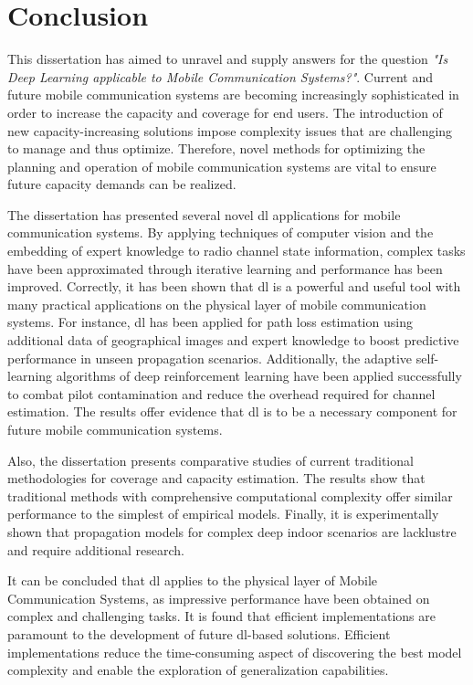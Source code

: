 \chapter{Conclusion}\label{ch:conclusion}

This dissertation has aimed to unravel and supply answers for the question \emph{"Is Deep Learning applicable to Mobile Communication Systems?"}. Current and future mobile communication systems are becoming increasingly sophisticated in order to increase the capacity and coverage for end users. The introduction of new capacity-increasing solutions impose complexity issues that are challenging to manage and thus optimize. Therefore, novel methods for optimizing the planning and operation of mobile communication systems are vital to ensure future capacity demands can be realized.

The dissertation has presented several novel \acrlong{dl} applications for mobile communication systems. By applying techniques of computer vision and the embedding of expert knowledge to radio channel state information, complex tasks have been approximated through iterative learning and performance has been improved. Correctly, it has been shown that \acrlong{dl} is a powerful and useful tool with many practical applications on the physical layer of mobile communication systems. For instance, \acrlong{dl} has been applied for path loss estimation using additional data of geographical images and expert knowledge to boost predictive performance in unseen propagation scenarios. Additionally, the adaptive self-learning algorithms of deep reinforcement learning have been applied successfully to combat pilot contamination and reduce the overhead required for channel estimation. The results offer evidence that \acrlong{dl} is to be a necessary component for future mobile communication systems.

Also, the dissertation presents comparative studies of current traditional methodologies for coverage and capacity estimation. The results show that traditional methods with comprehensive computational complexity offer similar performance to the simplest of empirical models. Finally, it is experimentally shown that propagation models for complex deep indoor scenarios are lacklustre and require additional research.

It can be concluded that \acrlong{dl} applies to the physical layer of Mobile Communication Systems, as impressive performance have been obtained on complex and challenging tasks. It is found that efficient implementations are paramount to the development of future \acrlong{dl}-based solutions. Efficient implementations reduce the time-consuming aspect of discovering the best model complexity and enable the exploration of generalization capabilities. 

